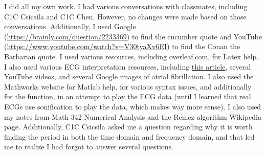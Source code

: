 I did all my own work.  I had various conversations with classmates, including C1C Csicsila and C1C Chen.  However, no changes were made based on those conversations.  Additionally, I used Google (\url{https://brainly.com/question/2233369}) to find the cucumber quote and YouTube (\url{https://www.youtube.com/watch?v=V30tyaXv6EI}) to find the Conan the Barbarian quote.  I used various resources, including overleaf.com, for Latex help.  I also used various ECG interpretation resources, including \href{https://clinical.stjohnwa.com.au/medical-library/ecg-library/introduction-overview/introduction-to-the-ecg#:~:text=Generated\%20when\%20there\%20is\%20movement,direction\%20of\%20these\%20electrical\%20impulses.&text=From\%20Atrial\%20depolarisation\%20(start\%20in,from\%20right\%20to\%20left\%20atrium.}{this article}, several YouTube videos, and several Google images of atrial fibrillation.  I also used the Mathworks website for Matlab help, for various syntax issues, and additionally for the  function, in an attempt to play the ECG data (until I learned that real ECGs use sonification to play the data, which makes way more sense).  I also used my notes from Math 342 Numerical Analysis and the Remez algorithm Wikipedia page.  Additionally, C1C Csicsila asked me a question regarding why it is worth finding the period in both the time domain and frequency domain, and that led me to realize I had forgot to answer several questions.